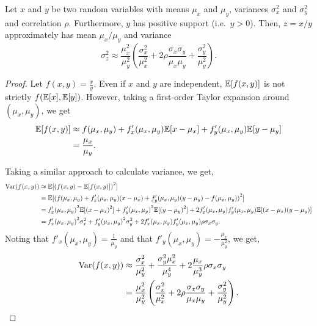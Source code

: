 \begin{lemma}
\label{lem:variance-ratio}
  Let $x$ and $y$ be two random variables with means $\mu_x$ and $\mu_y$, variances $\sigma^2_x$ and $\sigma^2_y$ and correlation $\rho$. Furthermore, $y$ has positive support (i.e.\ $y > 0$). 
  Then, $z = x / y$ approximately has mean $\mu_x / \mu_y$ and variance
  $$\sigma^2_z \approx \frac{\mu^2_x}{\mu_y^2} \left(\frac{\sigma_x^2}{\mu_x^2} 
    + 2\rho \frac{\sigma_x \sigma_y}{\mu_x \mu_y}
    + \frac{\sigma_y^2}{\mu_y^2} \right).$$

\end{lemma}
\begin{proof}
  Let $f(x,y) = \frac{x}{y}$.
  Even if $x$ and $y$ are independent, $\mathbb{E}[f(x,y)]$ is not strictly $f(\mathbb{E}[x],\mathbb{E}[y])$.
  However, taking a first-order Taylor expansion around $(\mu_x, \mu_y)$, we get
  \begin{align*}
    \mathbb{E}[f(x,y)] 
     &\approx f(\mu_x,\mu_y) + f_x'(\mu_x, \mu_y) \mathbb{E}[x - \mu_x] + f'_y(\mu_x, \mu_y) \mathbb{E}[y - \mu_y] \\
     &= \frac{\mu_x}{\mu_y}.
  \end{align*}

  Taking a similar approach to calculate variance, we get,
  \begin{align*}
    \text{Var}(f(x,y)) 
    &\approx \mathbb{E}[{(f(x,y) - \mathbb{E}[f(x,y)])}^2] \\
             &= \mathbb{E}[{(f(\mu_x,\mu_y) + f'_x(\mu_x, \mu_y) (x - \mu_x) + f'_y(\mu_x, \mu_y) (y - \mu_y) - f(\mu_x, \mu_y))}^2] \\
             &= {f'_x(\mu_x, \mu_y)}^2 \mathbb{E}[{(x - \mu_x)}^2] + {f'_y(\mu_x, \mu_y)}^2 \mathbb{E}[{(y - \mu_y)}^2] 
              + 2 f'_x(\mu_x, \mu_y)f'_y(\mu_x, \mu_y) \mathbb{E}[(x - \mu_x)(y - \mu_y)]\\
              &= {f'_x(\mu_x, \mu_y)}^2 \sigma_x^2 + {f'_y(\mu_x, \mu_y)}^2 \sigma_y^2
              + 2 f'_x(\mu_x, \mu_y)f'_y(\mu_x, \mu_y) \rho \sigma_x \sigma_y.
  \end{align*}
  Noting that $f'_x(\mu_x, \mu_y) = \frac{1}{\mu_y}$ and that $f'_y(\mu_x, \mu_y) = -\frac{\mu_x}{\mu_y^2}$, we get,
  \begin{align*}
    \text{Var}(f(x,y)) 
    &\approx \frac{\sigma_x^2}{\mu_y^2} + \frac{\sigma_y^2 \mu_x^2}{\mu_y^4}
    + 2 \frac{\mu_x}{\mu_y^3} \rho \sigma_x \sigma_y \\
    &= \frac{\mu^2_x}{\mu_y^2} \left(\frac{\sigma_x^2}{\mu_x^2} 
    + 2\rho \frac{\sigma_x \sigma_y}{\mu_x \mu_y}
    + \frac{\sigma_y^2}{\mu_y^2} \right).
 \end{align*}
\end{proof}

